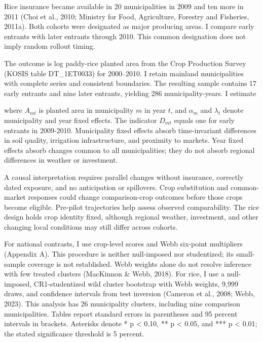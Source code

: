 
Rice insurance became available in 20 municipalities in 2009 and ten more in 2011 (Choi et al., 2010; Ministry for Food, Agriculture, Forestry and Fisheries, 2011a). Both cohorts were designated as major producing areas. I compare early entrants with later entrants through 2010. This common designation does not imply random rollout timing.

The outcome is log paddy-rice planted area from the Crop Production Survey (KOSIS table DT\_1ET0033) for 2000--2010. I retain mainland municipalities with complete series and consistent boundaries. The resulting sample contains 17 early entrants and nine later entrants, yielding 286 municipality-years. I estimate


where \(A_{mt}\) is planted area in municipality \(m\) in year \(t\), and \(\alpha_{m}\) and \(\lambda_{t}\) denote municipality and year fixed effects. The indicator \(D_{mt}\) equals one for early entrants in 2009-2010. Municipality fixed effects absorb time-invariant differences in soil quality, irrigation infrastructure, and proximity to markets. Year fixed effects absorb changes common to all municipalities; they do not absorb regional differences in weather or investment.


A causal interpretation requires parallel changes without insurance, correctly dated exposure, and no anticipation or spillovers. Crop substitution and common-market responses could change comparison-crop outcomes before those crops become eligible. Pre-pilot trajectories help assess observed comparability. The rice design holds crop identity fixed, although regional weather, investment, and other changing local conditions may still differ across cohorts.

For national contrasts, I use crop-level scores and Webb six-point multipliers (Appendix A). This procedure is neither null-imposed nor studentized; its small-sample coverage is not established. Webb weights alone do not resolve inference with few treated clusters (MacKinnon \& Webb, 2018). For rice, I use a null-imposed, CR1-studentized wild cluster bootstrap with Webb weights, 9,999 draws, and confidence intervals from test inversion (Cameron et al., 2008; Webb, 2023). This analysis has 26 municipality clusters, including nine comparison municipalities. Tables report standard errors in parentheses and 95 percent intervals in brackets. Asterisks denote * p < 0.10, ** p < 0.05, and *** p < 0.01; the stated significance threshold is 5 percent.

